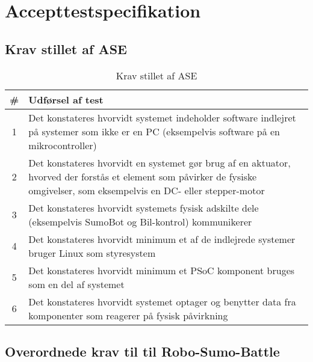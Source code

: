 \section{Accepttestspecifikation}

\subsection{Krav stillet af ASE}

\begin{table}[]
\centering
\caption{Krav stillet af ASE}\label{tab:ASE Krav}
\begin{tabular}{c p{7cm}}\toprule
\# & \textbf{Udførsel af test} \\ \midrule
1 & Det konstateres hvorvidt systemet indeholder software indlejret på systemer som ikke er en PC (eksempelvis software på en mikrocontroller)\\\midrule
2 & Det konstateres hvorvidt en systemet gør brug af en aktuator, hvorved der forstås et element som påvirker de fysiske omgivelser, som eksempelvis en DC- eller stepper-motor \\\midrule
3 & Det konstateres hvorvidt systemets fysisk adskilte dele (eksempelvis SumoBot og Bil-kontrol) kommunikerer\\\midrule
4 & Det konstateres hvorvidt minimum et af de indlejrede systemer bruger Linux som styresystem \\\midrule
5 & Det konstateres hvorvidt minimum et PSoC komponent bruges som en del af systemet\\\midrule
6 & Det konstateres hvorvidt systemet optager og benytter data fra komponenter som reagerer på fysisk påvirkning\\\bottomrule
\end{tabular}
\end{table}

\subsection{Overordnede krav til til Robo-Sumo-Battle}

